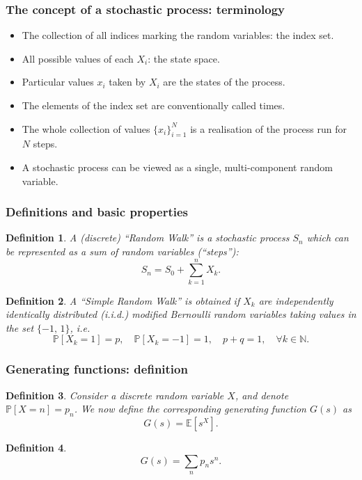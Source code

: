 \documentclass{article}
\newtheorem{definition}{Definition}
\newcommand{\Prob}{\mathbb{P}}
\newcommand{\E}{\mathbb{E}}
\begin{document}
\subsubsection{The concept of a stochastic process: terminology}
\begin{itemize}
    \item The collection of all indices marking the random variables: the index set.
    \item All possible values of each $X_i$: the state space.
    \item Particular values $x_i$ taken by $X_i$ are the states of the process.
    \item The elements of the index set are conventionally called times.
    \item The whole collection of values $\{ x_i \}_{i=1}^N$ is a realisation of the process run for $N$ steps.
    \item A stochastic process can be viewed as a single, multi-component random variable.
\end{itemize}

\subsubsection{Definitions and basic properties}
\begin{definition}
    A (discrete) ``Random Walk'' is a stochastic process $S_n$ which can be represented as a sum of random variables (``steps''):
    \begin{equation}
        S_n = S_0+\sum_{k=1}^n X_k.
    \end{equation}
\end{definition}
\begin{definition}
    A ``Simple Random Walk'' is obtained if $X_k$ are independently identically distributed (i.i.d.) modified Bernoulli random variables taking values in the set $\{-1,\,1\}$, i.e.
    \begin{equation}
        \Prob[X_k=1]=p,\quad\Prob[X_k=-1]=1,\quad p+q=1,\quad \forall k\in \mathbb{N}. \nonumber
    \end{equation}
\end{definition}
\subsubsection{Generating functions: definition}
\begin{definition}
    Consider a discrete random variable $X$, and denote $\Prob[X=n]=p_n$. We now define the corresponding generating function $G(s)$ as
    \begin{equation}
        G(s) = \E[s^X].
    \end{equation}
\end{definition}
\begin{definition}
    \begin{equation}
        G(s) = \sum_n p_n s^n.
    \end{equation}
\end{definition}
\end{document}
